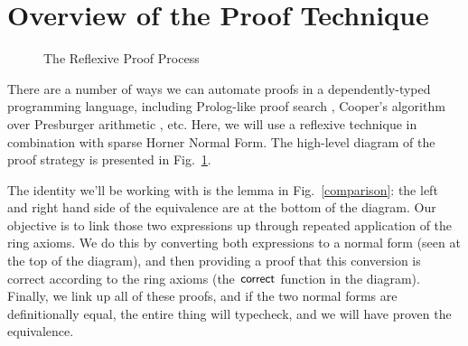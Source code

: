 \documentclass[acmsmall, screen, nonacm, timestamp, review]{acmart}
\theoremstyle{definition}
\theoremstyle{definition}
\begin{document}
\section{Overview of the Proof Technique}
\begin{figure}
  \vspace*{-50pt}
  \caption{The Reflexive Proof Process}
  \label{proof-process}
\end{figure}

There are a number of ways we can automate proofs in a dependently-typed
programming language, including Prolog-like proof search \cite{kokke_auto_2015},
Cooper's algorithm over Presburger arithmetic \cite{allais_deciding_2011}, etc.
Here, we will use a reflexive technique \cite{boutin_using_1997} in combination
with sparse Horner Normal Form. The high-level diagram of the proof strategy is
presented in Fig.~\ref{proof-process}.

The identity we'll be working with is the lemma in Fig.~\ref{comparison}: the
left and right hand side of the equivalence are at the bottom of the diagram. Our
objective is to link those two expressions up through repeated application of
the ring axioms. We do this by converting both expressions to a normal form
(seen at the top of the diagram), and then providing a proof that this
conversion is correct according to the ring axioms (the
\(\AgdaFunction{correct}\) function in the diagram). Finally, we link up all of
these proofs, and if the two normal forms are definitionally equal, the entire
thing will typecheck, and we will have proven the equivalence.
\end{document}
